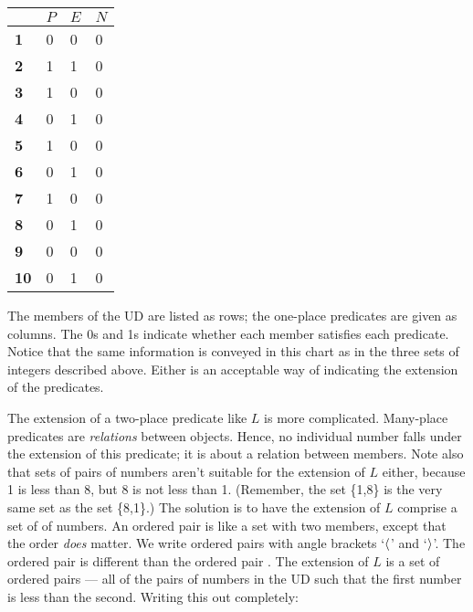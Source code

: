 \begin{table}[h!]
\centering
\begin{tabular}{l|l|l|l}
            & $P$ & $E$ & $N$ \\ \hline
\textbf{1}  & 0  & 0          & 0          \\
\textbf{2}  & 1  & 1          & 0          \\
\textbf{3}  & 1  & 0          & 0          \\
\textbf{4}  & 0  & 1          & 0          \\
\textbf{5}  & 1  & 0          & 0          \\
\textbf{6}  & 0  & 1          & 0          \\
\textbf{7}  & 1  & 0          & 0          \\
\textbf{8}  & 0  & 1          & 0          \\
\textbf{9}  & 0  & 0          & 0          \\
\textbf{10} & 0 & 1          & 0         
\end{tabular}
\end{table}

The members of the UD are listed as rows; the one-place predicates are given as columns. The 0s and 1s indicate whether each member satisfies each predicate. Notice that the same information is conveyed in this chart as in the three sets of integers described above. Either is an acceptable way of indicating the extension of the predicates.

The extension of a two-place predicate like $L$ is more complicated. {\color{black}Many-place predicates are \textit{relations} between objects.} Hence, no individual number falls under the extension of this predicate; it is about a relation between members. Note also that sets of pairs of numbers aren't suitable for the extension of $L$ either, because 1 is less than 8, but 8 is not less than 1. (Remember, the set \{1,8\} is the very same set as the set \{8,1\}.) The solution is to have the extension of $L$ comprise a set of  of numbers. An ordered pair is like a set with two members, except that the order \emph{does} matter. We write ordered pairs with angle brackets `$\langle$' and `$\rangle$'. The ordered pair \mbox{} is different than the ordered pair \mbox{}. The extension of $L$ is a set of ordered pairs --- all of the pairs of numbers in the UD such that the first number is less than the second. Writing this out completely:


